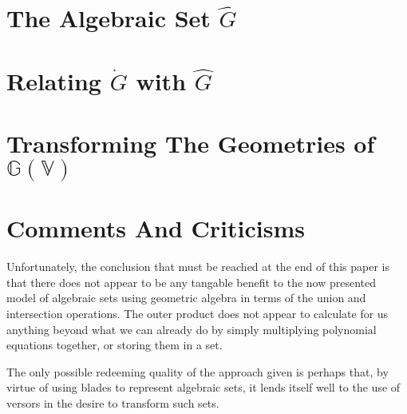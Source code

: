 \documentclass{birkjour}
\theoremstyle{definition}
\theoremstyle{remark}
\numberwithin{equation}{section}
\newcommand{\G}{\mathbb{G}}
\newcommand{\V}{\mathbb{V}}
\newcommand{\Gi}{\dot{G}}
\newcommand{\Go}{\hat{G}}
\begin{document}

\section{The Algebraic Set $\Go$}

\section{Relating $\Gi$ with $\Go$}


\section{Transforming The Geometries of $\G(\V)$}


\section{Comments And Criticisms}

Unfortunately, the conclusion that must be reached at the end of this paper is
that there does not appear to be any tangable benefit to the now
presented model of algebraic sets using geometric algebra in terms
of the union and intersection operations.  The outer product does not
appear to calculate for us anything beyond what we can already
do by simply multiplying polynomial equations together, or storing
them in a set.

The only possible redeeming quality of the approach given is perhaps
that, by virtue of using blades to represent algebraic sets, it lends
itself well to the use of versors in the desire to transform such sets.




\end{document}
